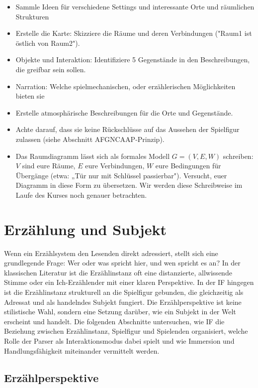 \documentclass[parskip=half,a4paper,11pt]{scrreprt}
\begin{document}
\begin{itemize}
    \item Sammle Ideen für verschiedene Settings und interessante Orte und räumlichen Strukturen 
    \item Erstelle die Karte: Skizziere die Räume und deren Verbindungen ("Raum1 ist östlich von Raum2").
    \item Objekte und Interaktion: Identifiziere 5 Gegenstände in den Beschreibungen, die greifbar sein sollen.
    \item Narration: Welche spielmechanischen, oder erzählerischen Möglichkeiten bieten sie
    \item Erstelle atmosphärische Beschreibungen für die Orte und Gegenstände. 
    \item Achte darauf, dass sie keine Rückschlüsse auf das Aussehen der Spielfigur zulassen (siehe Abschnitt AFGNCAAP-Prinzip).
    \item Das Raumdiagramm lässt sich als formales Modell $G=(V,E,W)$ schreiben: $V$ sind eure Räume, $E$ eure Verbindungen, $W$ eure Bedingungen für Übergänge (etwa: „Tür nur mit Schlüssel passierbar"). Versucht, euer Diagramm in diese Form zu übersetzen. Wir werden diese Schreibweise im Laufe des Kurses noch genauer betrachten.
\end{itemize}

\section{Erzählung und Subjekt}

Wenn ein Erzählsystem den Lesenden direkt adressiert, stellt sich eine grundlegende Frage: Wer oder was spricht hier, und wen spricht es an? In der klassischen Literatur ist die Erzählinstanz oft eine distanzierte, allwissende Stimme oder ein Ich-Erzählender mit einer klaren Perspektive. In der IF hingegen ist die Erzählinstanz strukturell an die Spielfigur gebunden, die gleichzeitig als Adressat und als handelndes Subjekt fungiert. Die Erzählperspektive ist keine stilistische Wahl, sondern eine Setzung darüber, wie ein Subjekt in der Welt erscheint und handelt. Die folgenden Abschnitte untersuchen, wie IF die Beziehung zwischen Erzählinstanz, Spielfigur und Spielenden organisiert, welche Rolle der Parser als Interaktionsmodus dabei spielt und wie Immersion und Handlungsfähigkeit miteinander vermittelt werden.

\subsection{Erzählperspektive}
\end{document}
